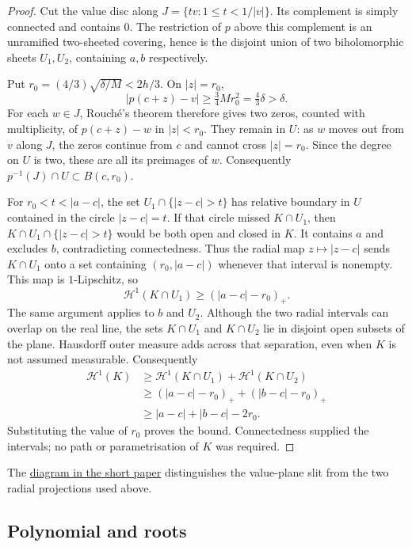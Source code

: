\begin{proof}
Cut the value disc along $J=\{tv:1\le t<1/|v|\}$. Its complement is simply
connected and contains $0$. The restriction of $p$ above this complement is
an unramified two-sheeted covering, hence is the disjoint union of two
biholomorphic sheets $U_1,U_2$, containing $a,b$ respectively.

Put $r_0=(4/3)\sqrt{\delta/M}<2h/3$. On $|z|=r_0$,
\[
 |p(c+z)-v|\ge\tfrac34Mr_0^2=\tfrac43\delta>\delta.
\]
For each $w\in J$, Rouch\'e's theorem therefore gives two zeros, counted
with multiplicity, of $p(c+z)-w$ in $|z|<r_0$. They remain in $U$: as $w$
moves out from $v$ along $J$, the zeros continue from $c$ and cannot cross
$|z|=r_0$. Since the degree on $U$ is two, these are all its preimages of
$w$. Consequently $p^{-1}(J)\cap U\subset B(c,r_0)$.

For $r_0<t<|a-c|$, the set $U_1\cap\{|z-c|>t\}$ has relative boundary
in $U$ contained in the circle $|z-c|=t$. If that circle missed $K\cap U_1$,
then $K\cap U_1\cap\{|z-c|>t\}$ would be both open and closed in $K$.
It contains $a$ and excludes $b$, contradicting connectedness. Thus the radial map $z\mapsto|z-c|$ sends
$K\cap U_1$ onto a set containing $(r_0,|a-c|)$ whenever that interval is
nonempty. This map is $1$-Lipschitz, so
\[
 \mathcal H^1(K\cap U_1)\ge (|a-c|-r_0)_+.
\]
The same argument applies to $b$ and $U_2$. Although the two radial
intervals can overlap on the real line, the sets $K\cap U_1$ and
$K\cap U_2$ lie in disjoint open subsets of the plane. Hausdorff outer
measure adds across that separation, even when $K$ is not assumed
measurable. Consequently
\begin{align*}
 \mathcal H^1(K)
 &\ge\mathcal H^1(K\cap U_1)+\mathcal H^1(K\cap U_2)\\
 &\ge(|a-c|-r_0)_+ + (|b-c|-r_0)_+\\
 &\ge |a-c|+|b-c|-2r_0.
\end{align*}
Substituting the value of $r_0$ proves the bound. Connectedness supplied
the intervals; no path or parametrisation of $K$ was required.
\end{proof}

The \href{erdos-1041-lemniscate-newton-flow.pdf\#bottleneck-geometry}
{diagram in the short paper} distinguishes the value-plane slit from
the two radial projections used above.

\subsection{Polynomial and roots}\label{subsec:counterexample-polynomial}

